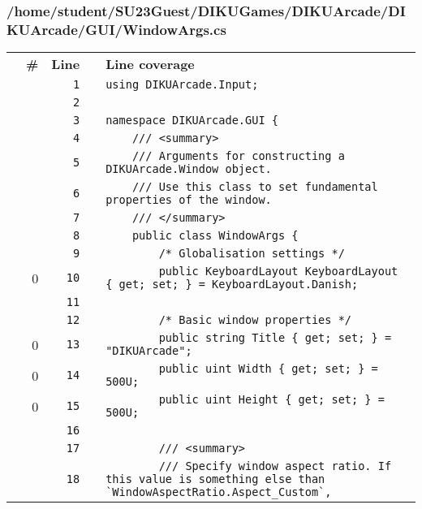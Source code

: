 \documentclass[a4paper,landscape,10pt]{article}
\begin{document}
\subsubsection{/home/student/SU23Guest/DIKUGames/DIKUArcade/DIKUArcade/GUI/WindowArgs.cs}
\begin{longtable}[l]{lrrll}
\textbf{} & \textbf{\#} & \textbf{Line} & \textbf{} & \textbf{Line coverage}\\
\cellcolor{gray} &  & \verb~1~ & & \verb~using DIKUArcade.Input;~\\
\cellcolor{gray} &  & \verb~2~ & & \verb~~\\
\cellcolor{gray} &  & \verb~3~ & & \verb~namespace DIKUArcade.GUI {~\\
\cellcolor{gray} &  & \verb~4~ & & \verb~    /// <summary>~\\
\cellcolor{gray} &  & \verb~5~ & & \verb~    /// Arguments for constructing a DIKUArcade.Window object.~\\
\cellcolor{gray} &  & \verb~6~ & & \verb~    /// Use this class to set fundamental properties of the window.~\\
\cellcolor{gray} &  & \verb~7~ & & \verb~    /// </summary>~\\
\cellcolor{gray} &  & \verb~8~ & & \verb~    public class WindowArgs {~\\
\cellcolor{gray} &  & \verb~9~ & & \verb~        /* Globalisation settings */~\\
\cellcolor{red} & 0 & \verb~10~ & & \verb~        public KeyboardLayout KeyboardLayout { get; set; } = KeyboardLayout.Danish;~\\
\cellcolor{gray} &  & \verb~11~ & & \verb~~\\
\cellcolor{gray} &  & \verb~12~ & & \verb~        /* Basic window properties */~\\
\cellcolor{red} & 0 & \verb~13~ & & \verb~        public string Title { get; set; } = "DIKUArcade";~\\
\cellcolor{red} & 0 & \verb~14~ & & \verb~        public uint Width { get; set; } = 500U;~\\
\cellcolor{red} & 0 & \verb~15~ & & \verb~        public uint Height { get; set; } = 500U;~\\
\cellcolor{gray} &  & \verb~16~ & & \verb~~\\
\cellcolor{gray} &  & \verb~17~ & & \verb~        /// <summary>~\\
\cellcolor{gray} &  & \verb~18~ & & \verb~        /// Specify window aspect ratio. If this value is something else than `WindowAspectRatio.Aspect_Custom`,~\\

\end{longtable}
\end{document}

